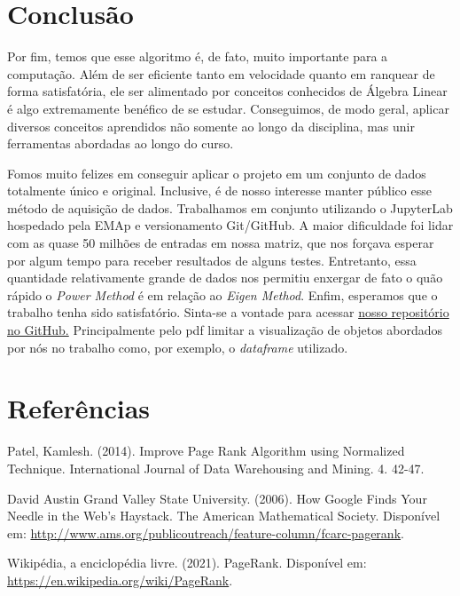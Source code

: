 \documentclass[11pt]{article}
\begin{document}
    \hypertarget{conclusuxe3o}{%
\section{Conclusão}\label{conclusuxe3o}}

Por fim, temos que esse algoritmo é, de fato, muito importante para a
computação. Além de ser eficiente tanto em velocidade quanto em ranquear
de forma satisfatória, ele ser alimentado por conceitos conhecidos de
Álgebra Linear é algo extremamente benéfico de se estudar. Conseguimos,
de modo geral, aplicar diversos conceitos aprendidos não somente ao
longo da disciplina, mas unir ferramentas abordadas ao longo do curso.

Fomos muito felizes em conseguir aplicar o projeto em um conjunto de
dados totalmente único e original. Inclusive, é de nosso interesse
manter público esse método de aquisição de dados. Trabalhamos em
conjunto utilizando o JupyterLab hospedado pela EMAp e versionamento
Git/GitHub. A maior dificuldade foi lidar com as quase 50 milhões de
entradas em nossa matriz, que nos forçava esperar por algum tempo para
receber resultados de alguns testes. Entretanto, essa quantidade
relativamente grande de dados nos permitiu enxergar de fato o quão
rápido o \emph{Power Method} é em relação ao \emph{Eigen Method}. Enfim,
esperamos que o trabalho tenha sido satisfatório. Sinta-se a vontade para
acessar \href{https://github.com/adamesalles/LinearAlgebra-PageRank}{nosso repositório no GitHub.}
Principalmente pelo pdf limitar a visualização de objetos abordados por nós no trabalho como,
por exemplo, o \emph{dataframe} utilizado.

\hypertarget{referuxeancias}{%
\section*{Referências}\label{referuxeancias}}

Patel, Kamlesh. (2014). Improve Page Rank Algorithm using Normalized
Technique. International Journal of Data Warehousing and Mining. 4.
42-47.

David Austin Grand Valley State University. (2006). How Google Finds
Your Needle in the Web's Haystack. The American Mathematical Society.
Disponível em:
\url{http://www.ams.org/publicoutreach/feature-column/fcarc-pagerank}.

Wikipédia, a enciclopédia livre. (2021). PageRank. Disponível em:
\url{https://en.wikipedia.org/wiki/PageRank}.


    
    
    
\end{document}
